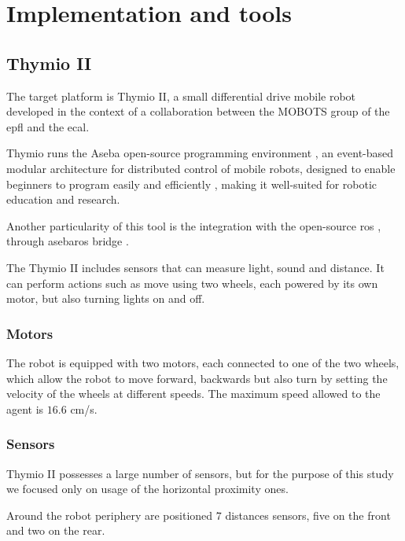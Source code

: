 \chapter{Implementation and tools}
\label{chap:impl}

\section{Thymio II}
\label{sec:thymio}

The target platform is Thymio II, a small differential drive mobile robot 
developed 
in the context of a collaboration between the MOBOTS group of the 
\gls{epfl} and 
the \gls{ecal}. 

Thymio runs the Aseba open-source programming environment 
\cite[see][]{magnenat2010aseba}, an event-based modular architecture for 
distributed control of mobile robots, designed to enable beginners to 
program 
easily and efficiently \cite[][]{mondada2017bringing}, making it well-suited 
for 
robotic education and research.

Another particularity of this tool is the integration with the open-source 
\gls{ros} \cite[][]{quigley2009ros}, through asebaros bridge 
\cite[][]{asebaros}. 

The Thymio II includes sensors that can measure light, sound and distance. 
It can 
perform actions such as move using two wheels, each powered by its own 
motor, 
but also turning lights on and off.

\subsection{Motors}
\label{subsection:thymotors}
The robot is equipped with two motors, each connected to one of the two 
wheels, which allow the robot to move forward, backwards but also turn by 
setting the velocity of the wheels at different speeds. The maximum speed 
allowed 
to the agent is $16.6$ \gls{cm/s}.

\subsection{Sensors}
\label{subsec:thysensors}

Thymio II possesses a large number of sensors, but for the purpose of this 
study we focused only on usage of the horizontal proximity ones. 

Around the robot periphery are positioned $7$ distances sensors, five on the 
front and two on the rear. 

